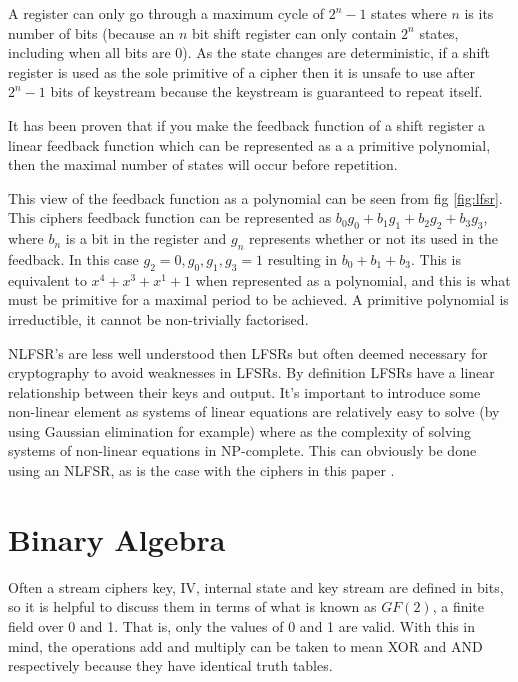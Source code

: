 \documentclass{report}
\let\Oldsection\section
\renewcommand{\section}{\FloatBarrier\Oldsection}
\begin{document}
A register can only go through a maximum cycle of $2^n-1$ states where $n$ is its number of bits (because an $n$ bit shift register can only contain $2^n$ states, including when all bits are 0). As the state changes are deterministic, if a shift register is used as the sole primitive of a cipher then it is unsafe to use after $2^n-1$ bits of keystream because the keystream is guaranteed to repeat itself.

It has been proven that if you make the feedback function of a shift register a linear feedback function which can be represented as a a primitive polynomial, then the maximal number of states will occur before repetition\cite{linearMaximal}.

This view of the feedback function as a polynomial can be seen from fig \ref{fig:lfsr}. This ciphers feedback function can be represented as  $b_0g_0+b_1g_1+b_2g_2+b_3g_3$, where $b_n$ is a bit in the register and $g_n$ represents whether or not its used in the feedback. In this case $g_2 = 0, g_0, g_1, g_3 = 1$ resulting in $b_0+b_1+b_3$. This is equivalent to $x^4+x^3+x^1+1$ when represented as a polynomial, and this is what must be primitive for a maximal period to be achieved. A primitive polynomial is irreductible, it cannot be non-trivially factorised\cite{primPoly}.

\begin{figure}[!htb]
\end{figure}
NLFSR's are less well understood then LFSRs but often deemed necessary for cryptography to avoid weaknesses in LFSRs. By definition LFSRs have a linear relationship between their keys and output. It's important to introduce some non-linear element as systems of linear equations are relatively easy to solve (by using Gaussian elimination for example\cite{gaussian}) where as the complexity of solving systems of non-linear equations in NP-complete\cite{NonlinearComp}. This can obviously be done using an NLFSR, as is the case with the ciphers in this paper .

\section{Binary Algebra}
Often a stream ciphers key, IV, internal state and key stream are defined in bits, so it is helpful to discuss them in terms of what is known as $\mathit{GF(2)}$, a finite field over 0 and 1. That is, only the values of 0 and 1 are valid. With this in mind, the operations add and multiply can be taken to mean XOR and AND respectively because they have identical truth tables.
\end{document}
